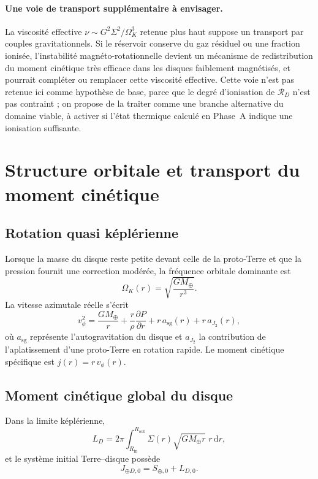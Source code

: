 \documentclass[11pt,a4paper,openany]{report}
\newcommand{\Mt}{M_{\oplus}}
\newcommand{\dd}{\mathrm{d}}
\newcommand{\RD}{\mathcal{R}_{D}}
\begin{document}
\paragraph{Une voie de transport supplémentaire à envisager.} La viscosité effective
$\nu\sim G^2\Sigma^2/\Omega_K^3$ retenue plus haut suppose un transport par couples gravitationnels.
Si le réservoir conserve du gaz résiduel ou une fraction ionisée, l'instabilité
magnéto-rotationnelle \cite{BalbusHawley1991} devient un mécanisme de redistribution du moment
cinétique très efficace dans les disques faiblement magnétisés, et pourrait compléter ou remplacer
cette viscosité effective. Cette voie n'est pas retenue ici comme hypothèse de base, parce que le
degré d'ionisation de $\RD$ n'est pas contraint ; on propose de la traiter comme une branche
alternative du domaine viable, à activer si l'état thermique calculé en Phase~A indique une
ionisation suffisante.

\section{Structure orbitale et transport du moment cinétique}
\subsection{Rotation quasi képlérienne}

Lorsque la masse du disque reste petite devant celle de la proto-Terre et que la pression fournit
une correction modérée, la fréquence orbitale dominante est
\begin{equation}
\Omega_K(r)=\sqrt{\frac{G\Mt}{r^3}}.
\label{eq:OmegaK}
\end{equation}
La vitesse azimutale réelle s'écrit
\begin{equation}
v_\phi^2=\frac{G\Mt}{r}+\frac{r}{\rho}\frac{\partial P}{\partial r}+r\,a_{\mathrm{sg}}(r)
+r\,a_{J_2}(r),
\label{eq:vphi}
\end{equation}
où $a_{\mathrm{sg}}$ représente l'autogravitation du disque et $a_{J_2}$ la contribution de
l'aplatissement d'une proto-Terre en rotation rapide. Le moment cinétique spécifique est
$j(r)=r\,v_\phi(r)$.

\subsection{Moment cinétique global du disque}

Dans la limite képlérienne,
\begin{equation}
L_D=2\pi\int_{R_{\mathrm{in}}}^{R_{\mathrm{out}}}\Sigma(r)\sqrt{G\Mt r}\;r\,\dd r,
\label{eq:LD}
\end{equation}
et le système initial Terre--disque possède
\begin{equation}
J_{\oplus D,0}=S_{\oplus,0}+L_{D,0}.
\label{eq:J0}
\end{equation}
\end{document}

